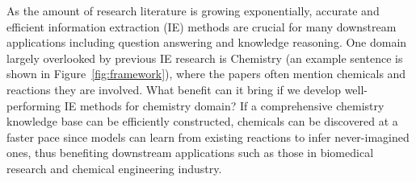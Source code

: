 As the amount of research literature is growing exponentially, accurate and efficient information extraction (IE) methods are crucial for many downstream applications including question answering and knowledge reasoning. One domain largely overlooked by previous IE research is Chemistry (an example sentence is shown in Figure~\ref{fig:framework}), where the papers often mention 
chemicals and reactions they are involved. What benefit can it bring if we develop well-performing IE methods for chemistry domain? If a comprehensive chemistry knowledge base can be efficiently constructed, chemicals can be discovered at a faster pace since models can learn from existing reactions to infer never-imagined ones, thus benefiting downstream applications such as those in biomedical research and chemical engineering industry.  

